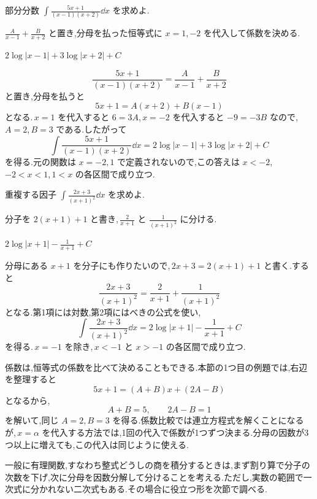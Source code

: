 \begin{example}{部分分数}
$\int\frac{5x+1}{(x-1)(x+2)}\dd x$ を求めよ.
\end{example}

$\frac A{x-1}+\frac B{x+2}$ と置き,分母を払った恒等式に $x=1,-2$ を代入して係数を決める.

$2\log|x-1|+3\log|x+2|+C$

\[
 \frac{5x+1}{(x-1)(x+2)}
 =\frac A{x-1}+\frac B{x+2}
\]
と置き,分母を払うと
\[
 5x+1=A(x+2)+B(x-1)
\]
となる.\,$x=1$ を代入すると $6=3A$,\,$x=-2$ を代入すると $-9=-3B$ なので,\,$A=2$,\,$B=3$ である.したがって
\[
 \int\frac{5x+1}{(x-1)(x+2)}\dd x
 =2\log|x-1|+3\log|x+2|+C
\]
を得る.元の関数は $x=-2,1$ で定義されないので,この答えは $x<-2$,\,$-2<x<1$,\,$1<x$ の各区間で成り立つ.

\begin{example}{重複する因子}
$\int\frac{2x+3}{(x+1)^2}\dd x$ を求めよ.
\end{example}

分子を $2(x+1)+1$ と書き,\,$\frac2{x+1}$ と $\frac1{(x+1)^2}$ に分ける.

$2\log|x+1|-\frac1{x+1}+C$

分母にある $x+1$ を分子にも作りたいので,\,$2x+3=2(x+1)+1$ と書く.すると
\[
 \frac{2x+3}{(x+1)^2}
 =\frac2{x+1}+\frac1{(x+1)^2}
\]
となる.第1項には対数,第2項にはべきの公式を使い,
\[
 \int\frac{2x+3}{(x+1)^2}\dd x
 =2\log|x+1|-\frac1{x+1}+C
\]
を得る.\,$x=-1$ を除き,\,$x<-1$ と $x>-1$ の各区間で成り立つ.

係数は,恒等式の係数を比べて決めることもできる.本節の1つ目の例題では,右辺を整理すると
\[
 5x+1=(A+B)x+(2A-B)
\]
となるから,
\[
 A+B=5,\qquad 2A-B=1
\]
を解いて,同じ $A=2$,\,$B=3$ を得る.係数比較では連立方程式を解くことになるが,\,$x=\alpha$ を代入する方法では,1回の代入で係数が1つずつ決まる.分母の因数が3つ以上に増えても,この代入は同じように使える.

一般に有理関数,すなわち整式どうしの商を積分するときは,まず割り算で分子の次数を下げ,次に分母を因数分解して分けることを考える.ただし,実数の範囲で一次式に分かれない二次式もある.その場合に役立つ形を次節で調べる.
